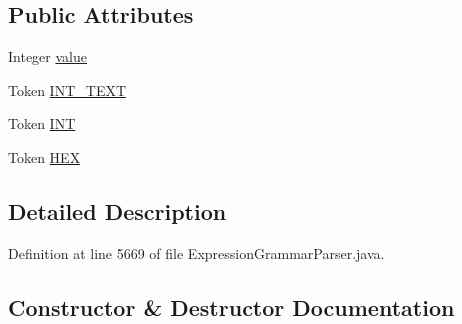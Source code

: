 \subsection*{Public Attributes}
\begin{DoxyCompactItemize}
\item 
Integer \hyperlink{classgov_1_1nasa_1_1jpf_1_1inspector_1_1server_1_1expression_1_1parser_1_1_expression_grammar_parser_1_1_int_value_context_a4c7175811f1802632486ad762d032ad5}{value}
\item 
Token \hyperlink{classgov_1_1nasa_1_1jpf_1_1inspector_1_1server_1_1expression_1_1parser_1_1_expression_grammar_parser_1_1_int_value_context_adb3b76b226a53594dce420deb9441691}{I\+N\+T\+\_\+\+T\+E\+XT}
\item 
Token \hyperlink{classgov_1_1nasa_1_1jpf_1_1inspector_1_1server_1_1expression_1_1parser_1_1_expression_grammar_parser_1_1_int_value_context_a08553f665454c1647a18c40d13d33cf1}{I\+NT}
\item 
Token \hyperlink{classgov_1_1nasa_1_1jpf_1_1inspector_1_1server_1_1expression_1_1parser_1_1_expression_grammar_parser_1_1_int_value_context_abe60fa1076615ccdab7695791a579c7d}{H\+EX}
\end{DoxyCompactItemize}


\subsection{Detailed Description}


Definition at line 5669 of file Expression\+Grammar\+Parser.\+java.



\subsection{Constructor \& Destructor Documentation}
